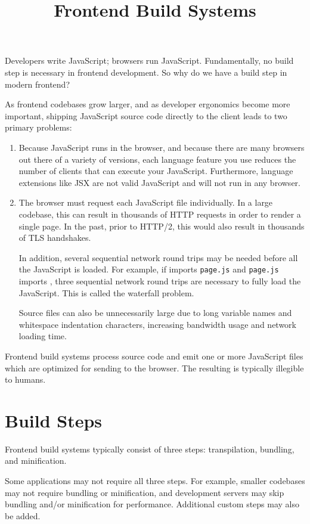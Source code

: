 \documentclass{article}
\title{Frontend Build Systems}
\begin{document}
Developers write JavaScript; browsers run JavaScript. Fundamentally, no build step is necessary in
frontend development. So why do we have a build step in modern frontend?

As frontend codebases grow larger, and as developer ergonomics become more important, shipping
JavaScript source code directly to the client leads to two primary problems:

\begin{enumerate}
  \item {} Because JavaScript runs in the browser, and because
    there are many browsers out there of a variety of versions, each language feature you use
    reduces the number of clients that can execute your JavaScript. Furthermore, language extensions
    like JSX are not valid JavaScript and will not run in any browser.

  \item {} The browser must request each JavaScript file individually. In a large
    codebase, this can result in thousands of HTTP requests in order to render a single page. In the
    past, prior to HTTP/2, this would also result in thousands of TLS handshakes.

    In addition, several sequential network round trips may be needed before all the JavaScript is
    loaded. For example, if  imports \texttt{page.js} and \texttt{page.js} imports
    , three sequential network round trips are necessary to fully load the JavaScript.
    This is called the waterfall problem.

    Source files can also be unnecessarily large due to long variable names and whitespace
    indentation characters, increasing bandwidth usage and network loading time.
\end{enumerate}

Frontend build systems process source code and emit one or more JavaScript files which are optimized
for sending to the browser. The resulting  is typically illegible to humans.

\section{Build Steps}

Frontend build systems typically consist of three steps: transpilation, bundling, and minification.

Some applications may not require all three steps. For example, smaller codebases may not require
bundling or minification, and development servers may skip bundling and/or minification for
performance. Additional custom steps may also be added.
\end{document}
